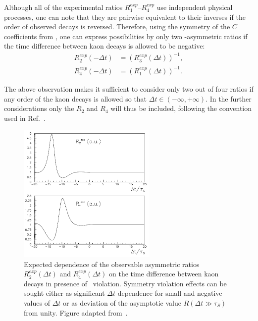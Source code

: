 Although all of the experimental ratios $R^{exp}_{1}$--$R^{exp}_{4}$ use independent physical processes, one can note that they are pairwise equivalent to their inverses if the order of observed decays is reversed. Therefore, using the symmetry of the $C$ coefficients from , one can express possibilities by only two \Ts-asymmetric ratios if the time difference between kaon decays is allowed to be negative:
\begin{eqnarray}
  R_2^{exp}({-\Delta t}) & = \left({R_3^{exp}(\Delta t)}\right)^{-1}, \\
  R_4^{exp}({-\Delta t}) & = \left({R_1^{exp}(\Delta t)}\right)^{-1}.
\end{eqnarray}

The above observation makes it sufficient to consider only two out of four ratios if any order of the kaon decays is allowed so that $\Delta t \in (-\infty,+\infty)$. In the further considerations only the $R_2$ and $R_4$ will thus be included, following the convention used in Ref.~\cite{theory:bernabeu-t}. 

\begin{figure}[htb]
  \centering
  \includegraphics[width=0.6\textwidth]{Chapter4_test_kloe/img/largeDt}
  \caption{\label{fig:strategy}
    Expected dependence of the observable asymmetric ratios  $R^{exp}_2(\Delta t)$ and $R^{exp}_4(\Delta t)$ on the time difference between kaon decays in presence of \Ts~violation.
    Symmetry violation effects can be sought either as significant $\Delta t$ dependence for small and negative values of $\Delta t$ or as deviation of the asymptotic value $R(\Delta t \gg \tau_{S})$ from unity.
    Figure adapted from~\cite{theory:bernabeu-t}.
  }
\end{figure}


